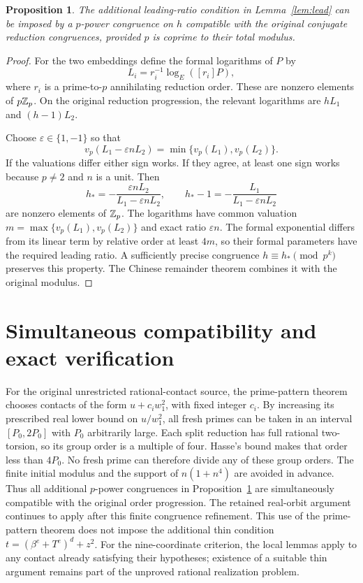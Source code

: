 \documentclass[11pt,a4paper]{article}
\newtheorem{proposition}{Proposition}[section]
\begin{document}
\begin{proposition}\label{prop:chooseh}
The additional leading-ratio condition in Lemma~\ref{lem:lead}
can be imposed by a $p$-power congruence on $h$ compatible with
the original conjugate reduction congruences, provided $p$ is
coprime to their total modulus.
\end{proposition}
\begin{proof}
For the two embeddings define the formal logarithms of $P$ by
\[
 L_i=r_i^{-1}\log_E([r_i]P),
\]
where $r_i$ is a prime-to-$p$ annihilating reduction order. These
are nonzero elements of $p\mathbb Z_p$. On the original reduction
progression, the relevant logarithms are $hL_1$ and $(h-1)L_2$.

Choose $\varepsilon\in\{1,-1\}$ so that
\[
 v_p(L_1-\varepsilon nL_2)
                   =\min\{v_p(L_1),v_p(L_2)\}.
\]
If the valuations differ either sign works. If they agree, at
least one sign works because $p\ne2$ and $n$ is a unit. Then
\[
 h_*=-\frac{\varepsilon nL_2}{L_1-\varepsilon nL_2},\qquad
 h_*-1=-\frac{L_1}{L_1-\varepsilon nL_2}
\]
are nonzero elements of $\mathbb Z_p$. The logarithms have common
valuation $m=\max\{v_p(L_1),v_p(L_2)\}$ and exact ratio
$\varepsilon n$. The formal exponential differs from its linear
term by relative order at least $4m$, so their formal parameters
have the required leading ratio. A sufficiently precise congruence
$h\equiv h_*\pmod {p^k}$ preserves this property. The Chinese
remainder theorem combines it with the original modulus.
\end{proof}

\section{Simultaneous compatibility and exact verification}

For the original unrestricted rational-contact source, the
prime-pattern theorem chooses contacts of the form
$u+c_iw_1^2$, with fixed integer $c_i$. By increasing its prescribed
real lower bound on $u/w_1^2$, all fresh primes can be taken in an
interval $[P_0,2P_0]$ with $P_0$ arbitrarily large. Each split
reduction has full rational two-torsion, so its group order is a
multiple of four. Hasse's bound makes that order less than $4P_0$.
No fresh prime can therefore divide any of these group orders.
The finite initial modulus and the support of $n(1+n^4)$ are
avoided in advance. Thus all additional $p$-power congruences in
Proposition~\ref{prop:chooseh} are simultaneously compatible with
the original order progression. The retained real-orbit argument
continues to apply after this finite congruence refinement.
This use of the prime-pattern theorem does not impose the additional
thin condition $t=(\beta^e+T^e)^d+z^2$. For the nine-coordinate
criterion, the local lemmas apply to any contact already satisfying
their hypotheses; existence of a suitable thin argument remains part
of the unproved rational realization problem.
\end{document}
